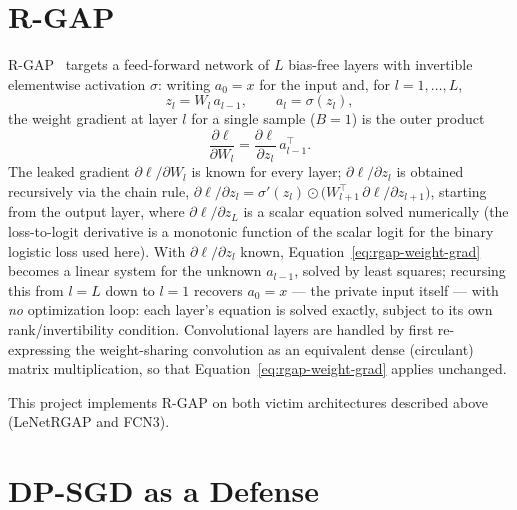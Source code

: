 \section{R-GAP}
\label{sec:rgap}

R-GAP~\cite{zhu2021rgap} targets a feed-forward network of $L$ bias-free
layers with invertible elementwise activation $\sigma$: writing $a_0 = x$
for the input and, for $l = 1, \dots, L$,
\begin{equation}
z_l = W_l \, a_{l-1}, \qquad a_l = \sigma(z_l),
\label{eq:rgap-forward}
\end{equation}
the weight gradient at layer $l$ for a single sample ($B=1$) is the outer
product
\begin{equation}
\frac{\partial \ell}{\partial W_l} = \frac{\partial \ell}{\partial z_l} \, a_{l-1}^{\top}.
\label{eq:rgap-weight-grad}
\end{equation}
The leaked gradient $\partial \ell / \partial W_l$ is known for every
layer; $\partial \ell/\partial z_l$ is obtained recursively via the chain
rule, $\partial \ell/\partial z_l = \sigma'(z_l) \odot \big(W_{l+1}^{\top} \, \partial \ell/\partial z_{l+1}\big)$,
starting from the output layer, where $\partial \ell/\partial z_L$ is a
scalar equation solved numerically (the loss-to-logit derivative is a
monotonic function of the scalar logit for the binary logistic loss used
here). With $\partial \ell/\partial z_l$ known, Equation~\eqref{eq:rgap-weight-grad}
becomes a linear system for the unknown $a_{l-1}$, solved by least squares;
recursing this from $l = L$ down to $l = 1$ recovers $a_0 = x$ --- the
private input itself --- with \emph{no} optimization loop: each layer's
equation is solved exactly, subject to its own rank/invertibility
condition. Convolutional layers are handled by first re-expressing the
weight-sharing convolution as an equivalent dense (circulant) matrix
multiplication, so that Equation~\eqref{eq:rgap-weight-grad} applies
unchanged.

This project implements R-GAP on both victim architectures described above
(LeNetRGAP and FCN3).

\section{DP-SGD as a Defense}
\label{sec:dpsgd}

